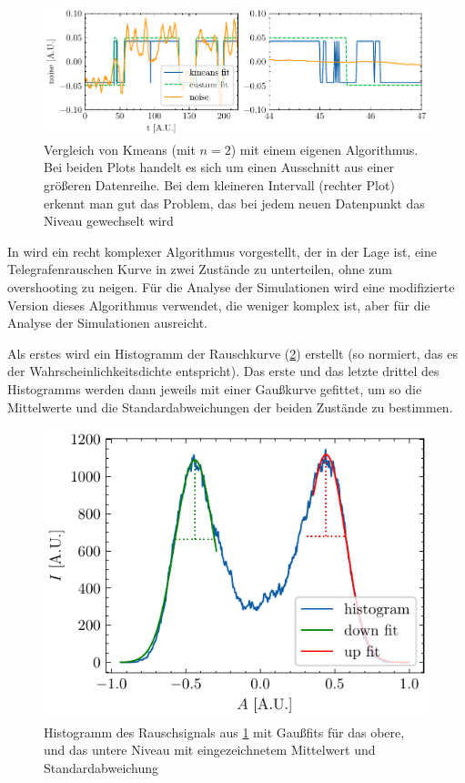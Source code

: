 \documentclass[main.tex]{subfiles}
\begin{document}
\begin{figure}[h]
    \centering
    \includegraphics{bilder/plots/theo-vis/telegraph_fit_comp.pdf}
    \caption{Vergleich von Kmeans (mit \(n=2\)) mit einem eigenen Algorithmus. Bei beiden Plots handelt es sich um einen Ausschnitt aus einer größeren Datenreihe. Bei dem kleineren Intervall (rechter Plot) erkennt man gut das Problem, das bei jedem neuen Datenpunkt das Niveau gewechselt wird}\label{fig:fit_comp}
\end{figure}

In \cite{random-telegraph-analysis} wird ein recht komplexer Algorithmus vorgestellt, der in der Lage ist, eine Telegrafenrauschen Kurve in zwei Zustände zu unterteilen, ohne zum overshooting zu neigen. Für die Analyse der Simulationen wird eine modifizierte Version dieses Algorithmus verwendet, die weniger komplex ist, aber für die Analyse der Simulationen ausreicht.

Als erstes wird ein Histogramm der Rauschkurve (\cref{fig:hist_fit}) erstellt (so normiert, das es der Wahrscheinlichkeitsdichte entspricht). \label{sec:algo}
Das erste und das letzte drittel des Histogramms werden dann jeweils mit einer Gaußkurve gefittet, um so die Mittelwerte und die Standardabweichungen der beiden Zustände zu bestimmen.

\begin{figure}[h]
    \centering
    \includegraphics{bilder/plots/theo-vis/hist_fit.pdf}
    \caption{Histogramm des Rauschsignals aus \cref{fig:fit_comp} mit Gaußfits für das obere, und das untere Niveau mit eingezeichnetem Mittelwert und Standardabweichung}
    \label{fig:hist_fit}
\end{figure}
\end{document}
